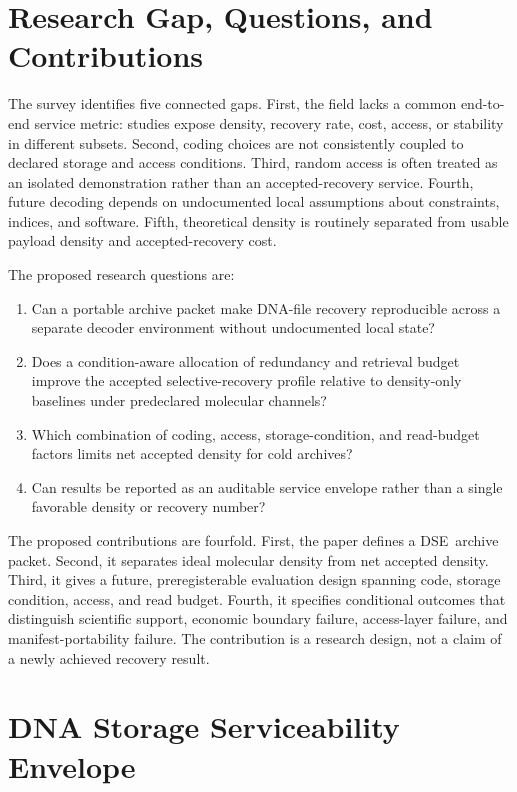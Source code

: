 \documentclass[conference]{IEEEtran}
\newcommand{\DSE}{\textsc{DSE}}
\begin{document}
\section{Research Gap, Questions, and Contributions}

The survey identifies five connected gaps. First, the field lacks a common end-to-end service metric: studies expose density, recovery rate, cost, access, or stability in different subsets. Second, coding choices are not consistently coupled to declared storage and access conditions. Third, random access is often treated as an isolated demonstration rather than an accepted-recovery service. Fourth, future decoding depends on undocumented local assumptions about constraints, indices, and software. Fifth, theoretical density is routinely separated from usable payload density and accepted-recovery cost.

The proposed research questions are:

\begin{enumerate}
\item Can a portable archive packet make DNA-file recovery reproducible across a separate decoder environment without undocumented local state?
\item Does a condition-aware allocation of redundancy and retrieval budget improve the accepted selective-recovery profile relative to density-only baselines under predeclared molecular channels?
\item Which combination of coding, access, storage-condition, and read-budget factors limits net accepted density for cold archives?
\item Can results be reported as an auditable service envelope rather than a single favorable density or recovery number?
\end{enumerate}

The proposed contributions are fourfold. First, the paper defines a \DSE\ archive packet. Second, it separates ideal molecular density from net accepted density. Third, it gives a future, preregisterable evaluation design spanning code, storage condition, access, and read budget. Fourth, it specifies conditional outcomes that distinguish scientific support, economic boundary failure, access-layer failure, and manifest-portability failure. The contribution is a research design, not a claim of a newly achieved recovery result.

\section{DNA Storage Serviceability Envelope}
\end{document}
